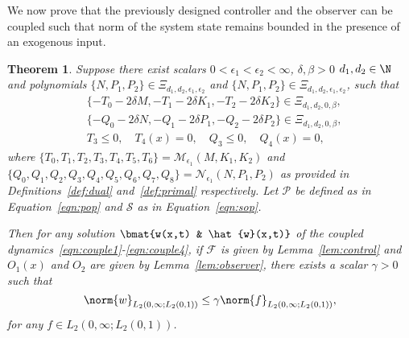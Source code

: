 \documentclass[US letter, 9 pt, conference]{ieeeconf}  \usepackage{setspace}
\newtheorem{theorem}{Theorem}
\newcommand{\wh}{\hat{w}}
\newcommand{\lt}{L_2(0,1)}
\newcommand{\mcl}[1]{\mathcal{#1}}
\newcommand{\pop}{\mathcal{P}}
\newcommand{\sop}{\mathcal{S}}
\begin{document}
We now prove that the previously designed controller and the observer can be coupled such that norm of the system state remains bounded in the presence of an exogenous input.
\begin{theorem}\label{thm:coupled}
Suppose there exist scalars $0<\epsilon_1<\epsilon_2<\infty$, $\delta,\beta>0$ $d_1,d_2 \in \N$ and polynomials $\{N,P_1,P_2\} \in \Xi_{d_1,d_2,\epsilon_1,\epsilon_2}$ and $\{N,P_1,P_2\} \in \Xi_{d_1,d_2,\epsilon_1,\epsilon_2}$, such that
\begin{align*}
&\{-T_0-2\delta M,-T_1-2\delta K_1,-T_2-2\delta K_2\} \in \Xi_{d_1,d_2,0,\beta},\\
&\{-Q_0-2\delta N,-Q_1-2\delta P_1,-Q_2-2\delta P_2\} \in \Xi_{d_1,d_2,0,\beta},\\
&T_3 \leq 0, \quad T_4(x)=0, \quad Q_3 \leq 0, \quad Q_4(x)=0,
\end{align*} where $\{T_0,T_1,T_2,T_3,T_4,T_5,T_6\}=\mcl{M}_{\epsilon_1}\left(M,K_1,K_2\right)$ and  $\{Q_0,Q_1,Q_2,Q_3,Q_4,Q_5,Q_6,Q_7,Q_8\}=\mcl{N}_{\epsilon_1}\left(N,P_1,P_2\right)$ as provided in Definitions~\ref{def:dual} and~\ref{def:primal} respectively. Let $\pop$ be defined as in Equation~\eqref{eqn:pop} and $\sop$ as in Equation~\eqref{eqn:sop}.

Then for any solution $\bmat{w(x,t) & \wh(x,t)}$ of the coupled dynamics~\eqref{eqn:couple1}-\eqref{eqn:couple4}, if $\mcl{F}$ is given by Lemma~\ref{lem:control} and  $O_1(x)$ and $O_2$ are given by Lemma~\ref{lem:observer}, there exists a scalar $\gamma>0$ such that
\[\norm{w}_{L_2\left(0,\infty;\lt \right)} \leq \gamma \norm{f}_{L_2\left(0,\infty;\lt \right)},\] for any $f \in L_2\left(0,\infty;\lt \right)$.
\end{theorem}
\end{document}
